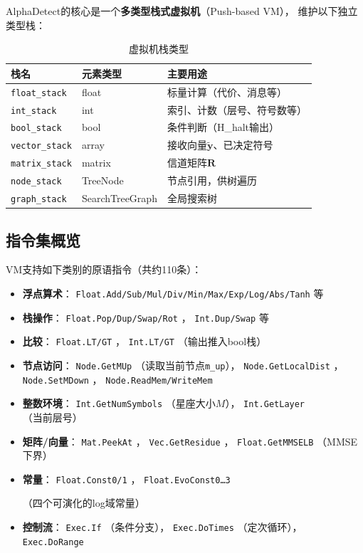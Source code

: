 \documentclass[12pt, a4paper]{ctexart}
\newcommand{\cbox}[1]{%
  \begingroup
  \setlength{\fboxsep}{4pt}%
  \colorbox{ccode}{\texttt{\small #1}}%
  \endgroup
}
\begin{document}
AlphaDetect的核心是一个\textbf{多类型栈式虚拟机}（Push-based VM），
维护以下独立类型栈：

\begin{table}[H]
  \centering
  \caption{虚拟机栈类型}
  \label{tab:stacks}
  \begin{tabular}{lll}
    \toprule
    栈名 & 元素类型 & 主要用途 \\
    \midrule
    \texttt{float\_stack}  & float  & 标量计算（代价、消息等） \\
    \texttt{int\_stack}    & int    & 索引、计数（层号、符号数等） \\
    \texttt{bool\_stack}   & bool   & 条件判断（H\_halt输出） \\
    \texttt{vector\_stack} & array  & 接收向量$\tilde{\mathbf{y}}$、已决定符号 \\
    \texttt{matrix\_stack} & matrix & 信道矩阵$\mathbf{R}$ \\
    \texttt{node\_stack}   & TreeNode & 节点引用，供树遍历 \\
    \texttt{graph\_stack}  & SearchTreeGraph & 全局搜索树 \\
    \bottomrule
  \end{tabular}
\end{table}

\subsection{指令集概览}

VM支持如下类别的原语指令（共约110条）：
\begin{itemize}[leftmargin=2em]
  \item \textbf{浮点算术}：\cbox{Float.Add/Sub/Mul/Div/Min/Max/Exp/Log/Abs/Tanh}等
  \item \textbf{栈操作}：\cbox{Float.Pop/Dup/Swap/Rot}，\cbox{Int.Dup/Swap}等
  \item \textbf{比较}：\cbox{Float.LT/GT}，\cbox{Int.LT/GT}（输出推入bool栈）
  \item \textbf{节点访问}：\cbox{Node.GetMUp}（读取当前节点\texttt{m\_up}），
        \cbox{Node.GetLocalDist}，\cbox{Node.SetMDown}，
        \cbox{Node.ReadMem/WriteMem}
  \item \textbf{整数环境}：\cbox{Int.GetNumSymbols}（星座大小$M$），
        \cbox{Int.GetLayer}（当前层号）
  \item \textbf{矩阵/向量}：\cbox{Mat.PeekAt}，\cbox{Vec.GetResidue}，
        \cbox{Float.GetMMSELB}（MMSE下界）
  \item \textbf{常量}：\cbox{Float.Const0/1}，\cbox{Float.EvoConst0\ldots3}
        （四个可演化的log域常量）
  \item \textbf{控制流}：\cbox{Exec.If}（条件分支），
        \cbox{Exec.DoTimes}（定次循环），\cbox{Exec.DoRange}
\end{itemize}
\end{document}
